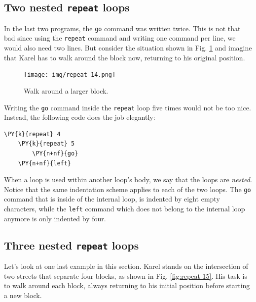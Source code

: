 \subsection{Two nested {\tt repeat} loops}

In the last two programs, the {\tt go} command was written twice. This is 
not that bad since using the {\tt repeat} command and writing one command 
per line, we would also need two lines. 
But consider the situation shown in Fig. \ref{fig:repeat-14} and imagine
that Karel has to walk around the block now, returning to his original 
position.

\begin{figure}[!ht]
\begin{center}
\texttt{[image: img/repeat-14.png]}
\vspace{-0mm}
\caption{Walk around a larger block.}
\label{fig:repeat-14}
\end{center}
\end{figure}
\noindent
Writing the {\tt go} command inside the {\tt repeat} loop five times would not be too nice.
Instead, the following code does the job elegantly:\\

\begin{bbox}
\begin{Verbatim}[commandchars=\\\{\}]
\PY{k}{repeat} 4
    \PY{k}{repeat} 5
        \PY{n+nf}{go}
    \PY{n+nf}{left}
\end{Verbatim}
\end{bbox}
\vspace{6mm}

\noindent
When a loop is used within another loop's body, we say that the loops are {\em nested}.
Notice that the same indentation scheme applies to each of the two loops. The {\tt go}
command that is inside of the internal loop, is indented by eight empty characters, while 
the {\tt left} command which does not belong to the internal loop anymore is only indented 
by four.  

\subsection{Three nested {\tt repeat} loops} \label{subsec:3rep}

Let's look at one last example in this section. Karel stands on the intersection of 
two streets that separate four blocks, as shown in Fig. \ref{fig:repeat-15}. His 
task is to walk around each block, always returning to his initial position before 
starting a new block. 

